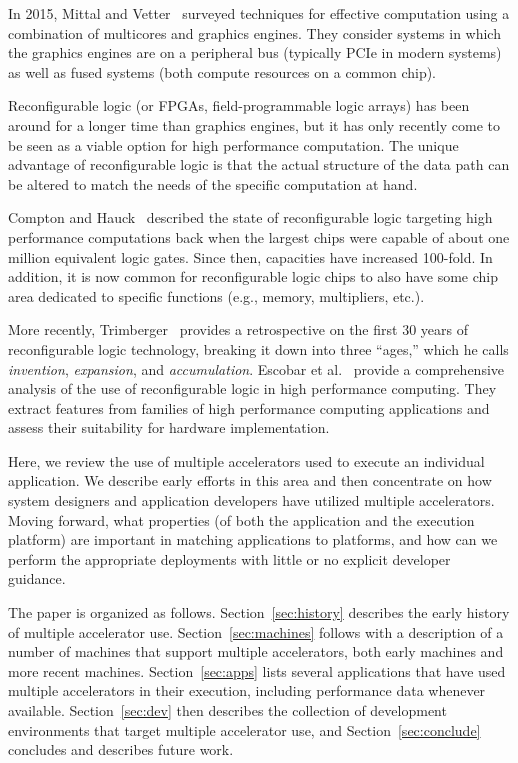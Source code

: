 In 2015, Mittal and Vetter~\cite{mv15} surveyed techniques for effective
computation using a combination of multicores and graphics engines. They
consider systems in which the graphics engines are on a peripheral bus
(typically PCIe in modern systems) as well as fused systems (both compute
resources on a common chip).

Reconfigurable logic (or FPGAs, field-programmable logic arrays) has been
around for a longer time than graphics engines, but it has only recently come
to be seen as a viable option for high performance computation.
The unique advantage of reconfigurable logic is that the actual 
structure of the data path can be altered to match the needs of the specific
computation at hand.

Compton and Hauck~\cite{ch02} described the state of reconfigurable logic
targeting high performance computations back when the largest chips were
capable of about one million equivalent logic gates.  Since then, capacities
have increased 100-fold.  In addition, it is now common for reconfigurable
logic chips to also have some chip area dedicated to specific functions (e.g.,
memory, multipliers, etc.).

More recently, Trimberger~\cite{Trimberger15} provides a retrospective on
the first 30 years of reconfigurable logic technology, breaking it down into
three ``ages,'' which he calls \emph{invention}, \emph{expansion}, and
\emph{accumulation}.  Escobar et al.~\cite{ecv16} provide a comprehensive
analysis of the use of reconfigurable logic in high performance computing.
They extract features from families of high performance computing
applications and assess their suitability for hardware implementation.

Here, we review the use of multiple accelerators used to execute an individual
application. We describe early efforts in this area and then concentrate on
how system designers and application developers have utilized multiple
accelerators.  Moving forward, what properties (of both the application and
the execution platform) are important in matching applications to platforms,
and how can we perform the appropriate deployments with little or no
explicit developer guidance.

The paper is organized as follows.  Section~\ref{sec:history} describes
the early history of multiple accelerator use.  Section~\ref{sec:machines}
follows with a description of a number of machines that support multiple
accelerators, both early machines and more recent machines.
Section~\ref{sec:apps} lists several applications that have used
multiple accelerators in their execution, including performance data
whenever available.
Section~\ref{sec:dev} then describes the collection of development
environments that target multiple accelerator use, and
Section~\ref{sec:conclude} concludes and describes future work.
